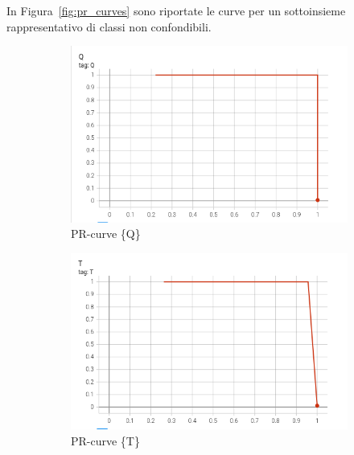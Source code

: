 In Figura~\ref{fig:pr_curves} sono riportate le curve per un sottoinsieme rappresentativo di classi non confondibili.

\begin{figure}[htbp]
    \centering
    \begin{subfigure}[t]{0.32\textwidth}
        \centering
        \includegraphics[width=\textwidth]{images/pr_curve1.png}
        \caption{PR-curve \{Q\}}
    \end{subfigure}
    \begin{subfigure}[t]{0.32\textwidth}
        \centering
        \includegraphics[width=\textwidth]{images/pr_curve2.png}
        \caption{PR-curve \{T\}}
    \end{subfigure}
    \begin{subfigure}[t]{0.32\textwidth}
        \centering

\end{subfigure}
\end{figure}
